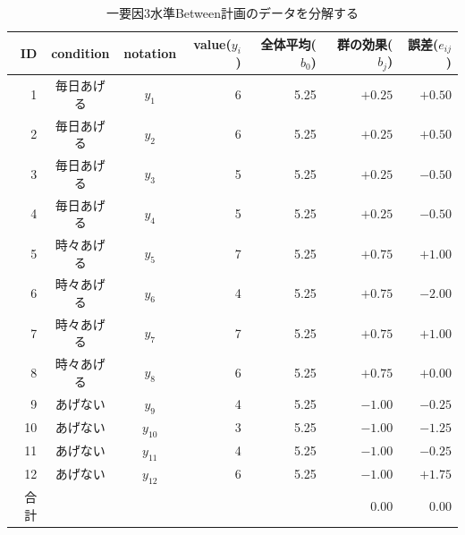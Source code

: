 \begin{table}[ht]
	\centering
	\caption{一要因3水準Between計画のデータを分解する}
	\begin{tabular}{rccrrrr}
		\hline
		ID & condition & notation & value($y_{i}$) & 全体平均($b_0$) & 群の効果($b_j$) & 誤差($e_{ij}$) \\
		\hline
		1  & 毎日あげる     & $y_{1}$  & 6              & 5.25        & $+0.25$     & $+0.50$      \\
		2  & 毎日あげる     & $y_{2}$  & 6              & 5.25        & $+0.25$     & $+0.50$      \\
		3  & 毎日あげる     & $y_{3}$  & 5              & 5.25        & $+0.25$     & $-0.50$      \\
		4  & 毎日あげる     & $y_{4}$  & 5              & 5.25        & $+0.25$     & $-0.50$      \\
		5  & 時々あげる     & $y_{5}$  & 7              & 5.25        & $+0.75$     & $+1.00$      \\
		6  & 時々あげる     & $y_{6}$  & 4              & 5.25        & $+0.75$     & $-2.00$      \\
		7  & 時々あげる     & $y_{7}$  & 7              & 5.25        & $+0.75$     & $+1.00$      \\
		8  & 時々あげる     & $y_{8}$  & 6              & 5.25        & $+0.75$     & $+0.00$      \\
		9  & あげない      & $y_{9}$  & 4              & 5.25        & $-1.00$     & $-0.25$      \\
		10 & あげない      & $y_{10}$ & 3              & 5.25        & $-1.00$     & $-1.25$      \\
		11 & あげない      & $y_{11}$ & 4              & 5.25        & $-1.00$     & $-0.25$      \\
		12 & あげない      & $y_{12}$ & 6              & 5.25        & $-1.00$     & $+1.75$      \\
		\hline\hline
		合計 &           &          &                &             & 0.00        & 0.00         \\\hline
	\end{tabular}
	\label{table::21_03}
\end{table}
